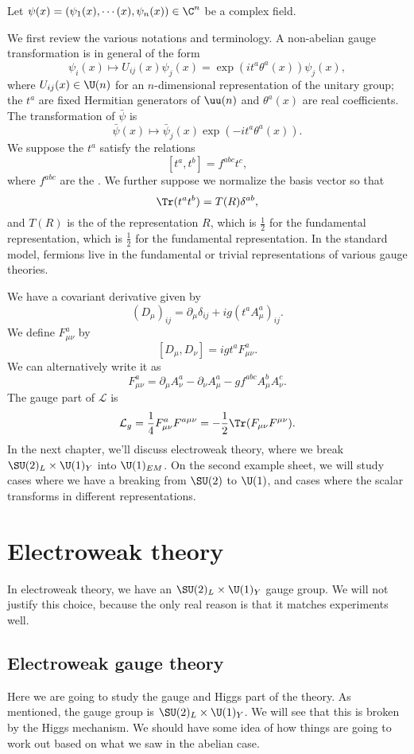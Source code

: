 \documentclass[a4paper]{article}
\begin{document}
Let $\psi(x) = (\psi_1(x), \cdots(x), \psi_n(x)) \in \C^n$ be a complex field. %

We first review the various notations and terminology. A non-abelian gauge transformation is in general of the form
\[
  \psi_i(x) \mapsto U_{ij}(x) \psi_j(x) = \exp(i t^a \theta^a(x)) \psi_j(x),
\]
where $U_{ij}(x) \in \U(n)$ for an $n$-dimensional representation of the unitary group; the $t^a$ are fixed Hermitian generators of $\uu(n)$ and $\theta^a(x)$ are real coefficients. The transformation of $\bar\psi$ is
\[
  \bar\psi(x) \mapsto \bar\psi_j (x) \exp(-i t^a \theta^a(x)).
\]
We suppose the $t^a$ satisfy the relations
\[
  [t^a, t^b] = f^{abc} t^c,
\]
where $f^{abc}$ are the . We further suppose we normalize the basis vector so that
\[
  \Tr (t^a t^b) = T(R) \delta^{ab},
\]
and $T(R)$ is the  of the representation $R$, which is $\frac{1}{2}$ for the fundamental representation, which is $\frac{1}{2}$ for the fundamental representation. In the standard model, fermions live in the fundamental or trivial representations of various gauge theories.

We have a covariant derivative given by
\[
  (D_\mu)_{ij} = \partial_\mu \delta_{ij} + i g(t^a A_\mu^a) _{ij}.
\]
We define $F_{\mu\nu}^a$ by
\[
  [D_\mu, D_\nu] = i g t^a F^a_{\mu\nu}.
\]
We can alternatively write it as
\[
  F_{\mu\nu}^a = \partial_\mu A_\nu^a - \partial_\nu A_\mu^a - g f^{abc} A_\mu^b A^c_\nu.
\]
The gauge part of $\mathcal{L}$ is
\[
  \mathcal{L}_g = \frac{1}{4} F_{\mu\nu}^a F^{a\mu\nu} = - \frac{1}{2} \Tr (F_{\mu\nu} F^{\mu\nu}).
\]
In the next chapter, we'll discuss electroweak theory, where we break $\SU(2)_L \times \U(1)_Y$ into $\U(1)_{EM}$. On the second example sheet, we will study cases where we have a breaking from $\SU(2)$ to $\U(1)$, and cases where the scalar transforms in different representations.

\section{Electroweak theory}
In electroweak theory, we have an $\SU(2)_L \times \U(1)_Y$ gauge group. We will not justify this choice, because the only real reason is that it matches experiments well.
\subsection{Electroweak gauge theory}
Here we are going to study the gauge and Higgs part of the theory. As mentioned, the gauge group is $\SU(2)_L \times \U(1)_Y$. We will see that this is broken by the Higgs mechanism. We should have some idea of how things are going to work out based on what we saw in the abelian case.
\end{document}
